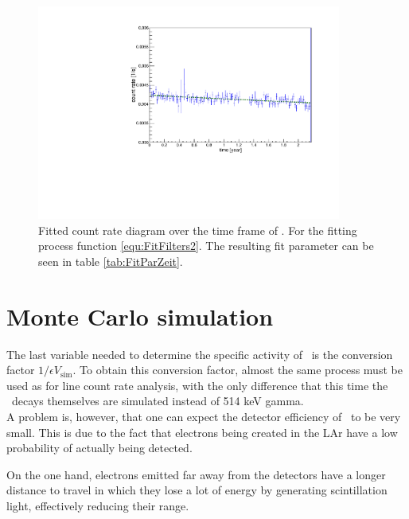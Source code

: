 \documentclass[encoding=utf8,british]{tumphthesis}
\begin{document}
\begin{figure}[t!]
	\centering
	\ifmakefigures%
	\includegraphics[width=100mm]{./Bilder/eventRateFit.pdf}
	\fi%
	\caption{
	    Fitted count rate diagram over the time frame of \PII.
	    For the fitting process function \ref{equ:FitFilters2}.
	    The resulting fit parameter can be seen in table \ref{tab:FitParZeit}.
	}
	\label{fig:ChangeInEventRateFit}
\end{figure}%


\section{Monte Carlo simulation}
\label{sec:MonteCarlo2}

The last variable needed to determine the specific activity of \Kr\ is the conversion factor $1/\epsilon V_{\mathrm{sim}}$.
To obtain this conversion factor, almost the same process must be used as for line count rate analysis, with the only difference that this time the \Kr\ decays themselves are simulated instead of 514 keV gamma.
\\

A problem is, however, that one can expect the detector efficiency of \Kr\ to be very small.
This is due to the fact that electrons being created in the LAr have a low probability of actually being detected.

On the one hand, electrons emitted far away from the detectors have a longer distance to travel in which they lose a lot of energy by generating scintillation light, effectively reducing their range.
\end{document}
